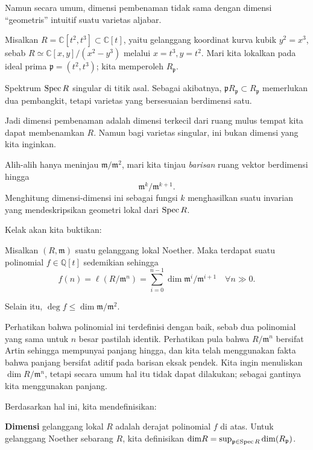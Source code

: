 Namun secara umum, dimensi pembenaman tidak sama dengan
dimensi ``geometris'' intuitif suatu varietas
aljabar.

\begin{example} 
Misalkan $R = \mathbb{C}[t^2, t^3] \subset \mathbb{C}[t]$, yaitu gelanggang koordinat
kurva kubik $y^2 =x^3$, sebab $R \simeq \mathbb{C}[x,y]/(x^2 - y^3)$
melalui $x = t^3, y = t^2$. Mari kita lokalkan pada ideal prima $\mathfrak{p} = (t^2,
t^3)$; kita memperoleh $R_{\mathfrak{p}}$. 

Spektrum $\operatorname{Spec} R$ singular di titik asal. Sebagai akibatnya, $\mathfrak{p}
R_{\mathfrak{p}} \subset R_{\mathfrak{p}}$ memerlukan dua pembangkit, tetapi
varietas yang bersesuaian berdimensi satu.
\end{example} 

Jadi dimensi pembenaman adalah dimensi terkecil dari ruang mulus tempat kita dapat membenamkan
$R$.
Namun bagi varietas singular, ini bukan dimensi yang kita inginkan. 

Alih-alih hanya meninjau $\mathfrak{m}/\mathfrak{m}^2$, mari kita
tinjau \emph{barisan} ruang vektor berdimensi hingga
\[ \mathfrak{m}^k/\mathfrak{m}^{k+1}.  \]
Menghitung dimensi-dimensi ini sebagai fungsi $k$ menghasilkan suatu invarian yang mendeskripsikan geometri
lokal dari $\operatorname{Spec} R$.

Kelak akan kita buktikan:
\begin{theorem} \label{hilbfnispolynomial}
Misalkan $(R, \mathfrak{m})$ suatu gelanggang lokal Noether. Maka terdapat suatu
polinomial
$f \in \mathbb{Q}[t]$ sedemikian sehingga
\[ f(n) =  \ell(R/\mathfrak{m}^n) = \sum_{i=0}^{n-1} \dim
\mathfrak{m}^i/\mathfrak{m}^{i+1} \quad \forall n \gg 0.  \]

Selain itu, $\deg f \leq \dim \mathfrak{m}/\mathfrak{m}^2$.
\end{theorem}


Perhatikan bahwa polinomial ini terdefinisi dengan baik, sebab dua polinomial yang sama untuk $n$ besar
pastilah identik. Perhatikan pula bahwa $R/\mathfrak{m}^n$ bersifat Artin sehingga mempunyai panjang hingga,
dan kita telah menggunakan fakta bahwa panjang bersifat aditif pada barisan eksak
pendek. Kita ingin menuliskan $\dim R/\mathfrak{m}^n$, tetapi secara umum
hal itu tidak dapat dilakukan; sebagai gantinya kita menggunakan panjang. 

Berdasarkan hal ini, kita mendefinisikan:
\begin{definition} 
\textbf{Dimensi} gelanggang lokal $R$ adalah derajat polinomial
$f$ di atas. Untuk gelanggang Noether sebarang $R$, kita definisikan $\mathrm{dim} R =
\sup_{\mathfrak{p} \in \operatorname{Spec} R} \mathrm{dim} (R_{\mathfrak{p}})$.
\end{definition} 


